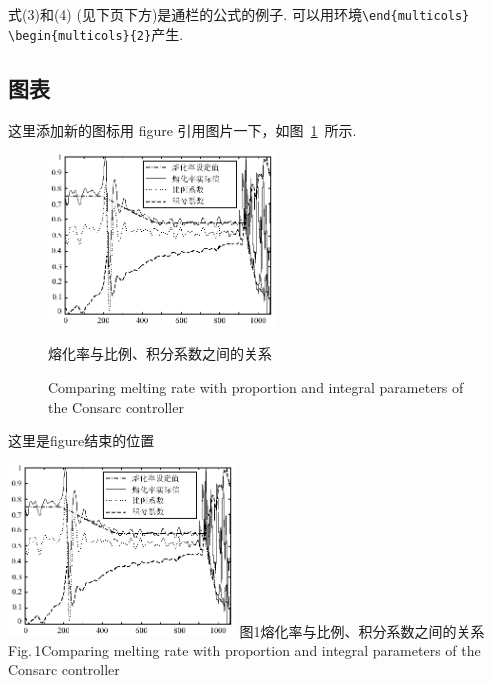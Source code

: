 \documentclass[fontset=mac]{aas}
\begin{document}
式(3)和(4) (见下页下方)是通栏的公式的例子.
可以用环境\verb|\end{multicols}| \verb|\begin{multicols}{2}|产生.

\subsection{图表}
这里添加新的图标用 figure 引用图片一下，如图~\ref{fig:thefirst}~所示.

\begin{figure}
	\centering
	\includegraphics[width=6cm]{01.eps}
	\vskip 2mm%
	\caption{熔化率与比例、积分系数之间的关系}
	
	\renewcommand{\figurename}{Fig.}
	\addtocounter{figure}{-1}
	\caption{Comparing melting rate with proportion and integral parameters of the Consarc controller}
	\label{fig:thefirst}
\end{figure}

这里是figure结束的位置

\begin{center}
    \includegraphics[width=6cm]{01.eps}
    \vskip 2mm%
    {\small 图1\quad 熔化率与比例、积分系数之间的关系\\
    Fig.\,1\quad Comparing melting rate with proportion and integral parameters of
    the Consarc controller }
\end{center}
\end{document}
